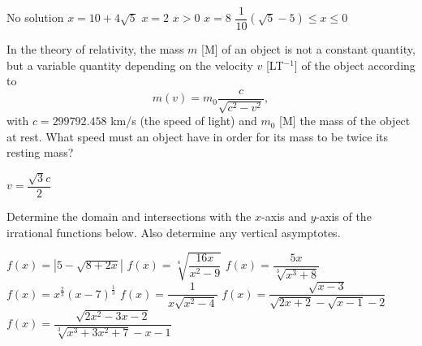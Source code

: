 \begin{Answer}\phantom{}
    \begin{multicols}{2}
   	
   	    \Question No solution
   	    \Question $x=10+4\sqrt{5}$ 
   	    \Question $x=2$ 
   	    \Question $x>0$ 
   	    \Question $x=8$ 
   	    \Question $\dfrac{1}{10} \left( \sqrt{5}-5 \right) \leq x \leq 0$ 
   	\EndCurrentQuestion
   	\end{multicols}
\end{Answer}
   	
\begin{Exercise}[difficulty=2] In the theory of relativity, the mass $m$ [M] of an object is not a constant quantity, but a variable
 	quantity depending on the velocity $v$ [LT$^{-1}$] of the object according to
 	\[m(v) = m_0 \dfrac{c}{\sqrt{c^2-v^2}},  \]
 	with $c = 299 792. 458$ km/s (the speed of light) and $m_0$ [M] the mass of the object at rest. What speed must an object have in order for its mass to be twice its resting mass? 

\end{Exercise}

\begin{Answer}\phantom{}
    $v = \dfrac{\sqrt{3}c}{2}$
\end{Answer}
 	

\begin{Exercise} Determine the domain and intersections with the $x$-axis and $y$-axis of the irrational functions below. Also determine any vertical asymptotes. 
	\begin{multicols}{2}
    \Question[difficulty = 1] $f(x) = |5-\sqrt{8+2x}|$
    \Question[difficulty = 1] $f(x) = \sqrt[4]{\dfrac{16x}{x^2-9}}$
    \Question[difficulty = 1] $f(x) = \dfrac{5x}{\sqrt[3]{x^3+8}}$
    \Question[difficulty = 1] $f(x) = x^{\frac{2}{3}}(x-7)^{\frac{1}{3}}$
	\Question[difficulty = 1] $f(x)=\dfrac{1}{x\sqrt{x^2-4}}$
	\Question[difficulty = 3] $f(x)=\dfrac{\sqrt{x-3}}{\sqrt{2x+2}-\sqrt{x-1}-2}$
	\ifanalysis\Question[difficulty = 2]\fi\ifcalculus\Question[difficulty = 3]\fi $f(x)=\dfrac{\sqrt{2x^2-3x-2}}{\sqrt[3]{x^3+3x^2+7}-x-1}$
	\EndCurrentQuestion
    \end{multicols}

\end{Exercise}


